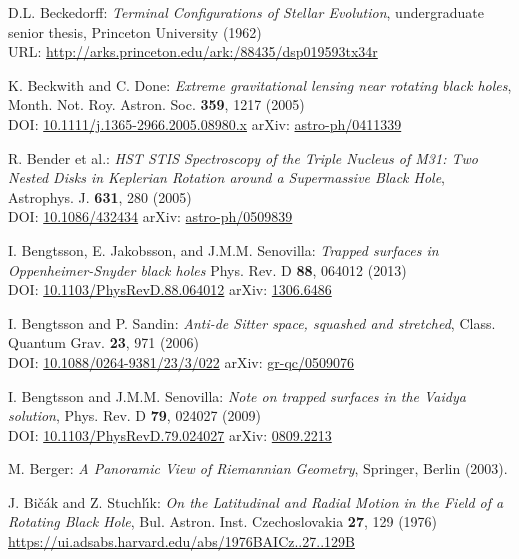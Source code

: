 \begin{thebibliography}{123}
D.L. Beckedorff:
{\em Terminal Configurations of Stellar Evolution},
undergraduate senior thesis, Princeton University (1962)\\
URL: \url{http://arks.princeton.edu/ark:/88435/dsp019593tx34r}

K. Beckwith and C. Done:
{\em Extreme gravitational lensing near rotating black holes},
Month. Not. Roy. Astron. Soc. {\bf 359}, 1217 (2005)\\
DOI: \href{https://doi.org/10.1111/j.1365-2966.2005.08980.x}{10.1111/j.1365-2966.2005.08980.x}\hfill
arXiv: \href{https://arxiv.org/abs/astro-ph/0411339}{astro-ph/0411339}

R. Bender et al.:
{\em HST STIS Spectroscopy of the Triple Nucleus of M31: Two Nested Disks in Keplerian Rotation around a Supermassive Black Hole},
Astrophys. J. {\bf 631}, 280 (2005)\\
DOI: \href{https://doi.org/10.1086/432434}{10.1086/432434}\hfill
arXiv: \href{https://arxiv.org/abs/astro-ph/0509839}{astro-ph/0509839}

I. Bengtsson, E. Jakobsson, and J.M.M. Senovilla:
{\em Trapped surfaces in Oppenheimer-Snyder black holes}
Phys. Rev. D {\bf 88}, 064012 (2013)\\
DOI: \href{https://doi.org/10.1103/PhysRevD.88.064012}{10.1103/PhysRevD.88.064012}\hfill
arXiv: \href{https://arxiv.org/abs/1306.6486}{1306.6486}

I. Bengtsson and P. Sandin:
{\em Anti-de Sitter space, squashed and stretched},
Class. Quantum Grav. {\bf 23}, 971 (2006)\\
DOI: \href{https://doi.org/10.1088/0264-9381/23/3/022}{10.1088/0264-9381/23/3/022}\hfill
arXiv: \href{https://arxiv.org/abs/gr-qc/0509076}{gr-qc/0509076}

I. Bengtsson and J.M.M. Senovilla:
{\em Note on trapped surfaces in the Vaidya solution},
Phys. Rev. D {\bf 79}, 024027 (2009)\\
DOI: \href{https://doi.org/10.1103/PhysRevD.79.024027}{10.1103/PhysRevD.79.024027}\hfill
arXiv: \href{https://arxiv.org/abs/0809.2213}{0809.2213}

M. Berger: {\em A Panoramic View of Riemannian Geometry},
Springer, Berlin (2003).

J. Bi\v{c}\'{a}k and Z. Stuchl\'{\i}k:
{\em On the Latitudinal and Radial Motion in the Field of a Rotating Black Hole},
Bul. Astron. Inst. Czechoslovakia {\bf 27}, 129 (1976)\\
\url{https://ui.adsabs.harvard.edu/abs/1976BAICz..27..129B}


\end{thebibliography}
